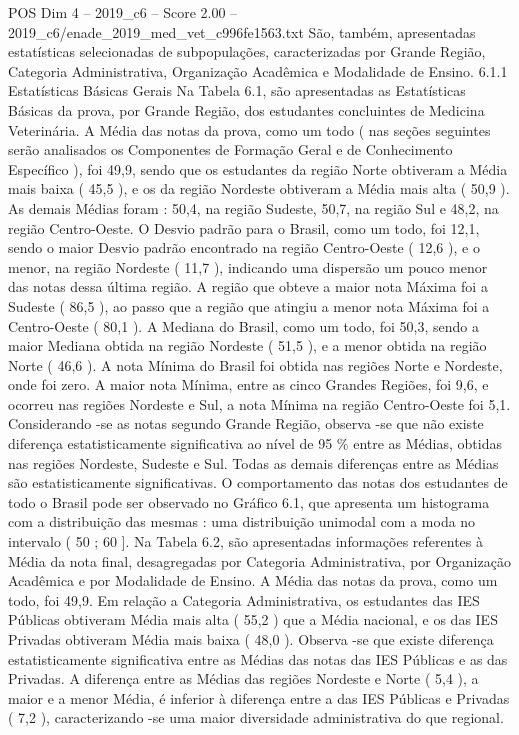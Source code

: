 \begin{textsample}{POS Dim 4 – 2019\_c6 – Score 2.00 – 2019\_c6/enade\_2019\_med\_vet\_c996fe1563.txt}
São, também, apresentadas estatísticas selecionadas de subpopulações, caracterizadas por Grande Região, Categoria Administrativa, Organização Acadêmica e Modalidade de Ensino. 6.1.1 Estatísticas Básicas Gerais Na Tabela 6.1, são apresentadas as Estatísticas Básicas da prova, por Grande Região, dos estudantes concluintes de Medicina Veterinária.
A Média das notas da prova, como um todo ( nas seções seguintes serão analisados os Componentes de Formação Geral e de Conhecimento Específico ), foi 49,9, sendo que os estudantes da região Norte obtiveram a Média mais baixa ( 45,5 ), e os da região Nordeste obtiveram a Média mais alta ( 50,9 ).
As demais Médias foram : 50,4, na região Sudeste, 50,7, na região Sul e 48,2, na região Centro-Oeste.
O Desvio padrão para o Brasil, como um todo, foi 12,1, sendo o maior Desvio padrão encontrado na região Centro-Oeste ( 12,6 ), e o menor, na região Nordeste ( 11,7 ), indicando uma dispersão um pouco menor das notas dessa última região.
A região que obteve a maior nota Máxima foi a Sudeste ( 86,5 ), ao passo que a região que atingiu a menor nota Máxima foi a Centro-Oeste ( 80,1 ).
A Mediana do Brasil, como um todo, foi 50,3, sendo a maior Mediana obtida na região Nordeste ( 51,5 ), e a menor obtida na região Norte ( 46,6 ).
A nota Mínima do Brasil foi obtida nas regiões Norte e Nordeste, onde foi zero.
A maior nota Mínima, entre as cinco Grandes Regiões, foi 9,6, e ocorreu nas regiões Nordeste e Sul, a nota Mínima na região Centro-Oeste foi 5,1.
Considerando -se as notas segundo Grande Região, observa -se que não existe diferença estatisticamente significativa ao nível de 95 \% entre as Médias, obtidas nas regiões Nordeste, Sudeste e Sul.
Todas as demais diferenças entre as Médias são estatisticamente significativas.
O comportamento das notas dos estudantes de todo o Brasil pode ser observado no Gráfico 6.1, que apresenta um histograma com a distribuição das mesmas : uma distribuição unimodal com a moda no intervalo ( 50 ; 60 ].
Na Tabela 6.2, são apresentadas informações referentes à Média da nota final, desagregadas por Categoria Administrativa, por Organização Acadêmica e por Modalidade de Ensino.
A Média das notas da prova, como um todo, foi 49,9.
Em relação a Categoria Administrativa, os estudantes das IES Públicas obtiveram Média mais alta ( 55,2 ) que a Média nacional, e os das IES Privadas obtiveram Média mais baixa ( 48,0 ).
Observa -se que existe diferença estatisticamente significativa entre as Médias das notas das IES Públicas e as das Privadas.
A diferença entre as Médias das regiões Nordeste e Norte ( 5,4 ), a maior e a menor Média, é inferior à diferença entre a das IES Públicas e Privadas ( 7,2 ), caracterizando -se uma maior diversidade administrativa do que regional.

\end{textsample}
